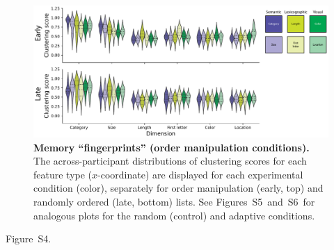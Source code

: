 \documentclass[11pt]{article}
\newcommand{\clusterCorrs}{S4}
\newcommand{\fingerprintsRandom}{S5}
\newcommand{\fingerprintsAdaptive}{S6}
\begin{document}
\begin{figure}[tp] \centering
    \includegraphics[width=\textwidth]{figures/fingerprints}
    
    \caption{\textbf{Memory ``fingerprints'' (order manipulation conditions).}
    The across-participant distributions of clustering scores for each feature
    type ($x$-coordinate) are displayed for each experimental condition
    (color), separately for order manipulation (early, top) and randomly
    ordered (late, bottom) lists. See
    Figures~\fingerprintsRandom~and~\fingerprintsAdaptive~for analogous plots
    for the random (control) and adaptive conditions.}
        \label{fig:fingerprints}
    \end{figure}

Figure~\clusterCorrs.
\end{document}
